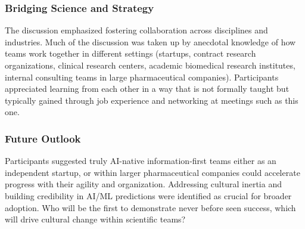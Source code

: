 \subsubsection{Bridging Science and Strategy}
The discussion emphasized fostering collaboration across disciplines and industries. Much of the discussion was taken up by anecdotal knowledge of how teams work together in different settings (startups, contract research organizations, clinical research centers, academic biomedical research institutes, internal consulting teams in large pharmaceutical companies). Participants appreciated learning from each other in a way that is not formally taught but typically gained through job experience and networking at meetings such as this one.

\subsubsection{Future Outlook} 
Participants suggested truly AI-native information-first teams either as an independent startup, or within larger pharmaceutical companies could accelerate progress with their agility and organization. Addressing cultural inertia and building credibility in AI/ML predictions were identified as crucial for broader adoption. Who will be the first to demonstrate never before seen success, which will drive cultural change within scientific teams?

